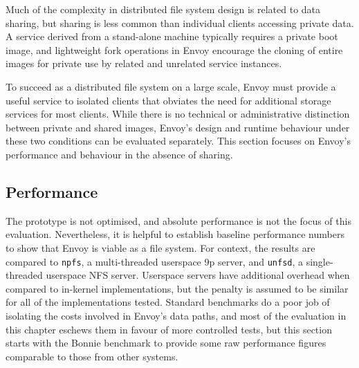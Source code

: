 Much of the complexity in distributed file system design is related to data sharing, but sharing is less common than individual clients accessing private data. A service derived from a stand-alone machine typically requires a private boot image, and lightweight fork operations in Envoy encourage the cloning of entire images for private use by related and unrelated service instances.

To succeed as a distributed file system on a large scale, Envoy must provide a useful service to isolated clients that obviates the need for additional storage services for most clients. While there is no technical or administrative distinction between private and shared images, Envoy's design and runtime behaviour under these two conditions can be evaluated separately. This section focuses on Envoy's performance and behaviour in the absence of sharing.

\subsection{Performance}

The prototype is not optimised, and absolute performance is not the focus of this evaluation. Nevertheless, it is helpful to establish baseline performance numbers to show that Envoy is viable as a file system. For context, the results are compared to \texttt{npfs}, a multi-threaded userspace 9p server, and \texttt{unfsd}, a single-threaded userspace NFS server. Userspace servers have additional overhead when compared to in-kernel implementations, but the penalty is assumed to be similar for all of the implementations tested. Standard benchmarks do a poor job of isolating the costs involved in Envoy's data paths, and most of the evaluation in this chapter eschews them in favour of more controlled tests, but this section starts with the Bonnie benchmark to provide some raw performance figures comparable to those from other systems.

